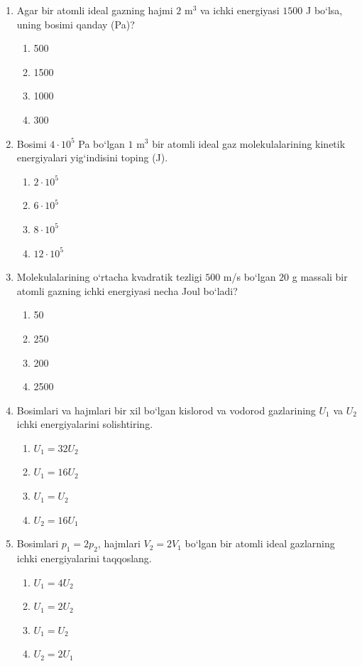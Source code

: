 \begin{enumerate}
\begin{enumerate}[label=\Alph*)]
\end{enumerate}

\item Agar bir atomli ideal gazning hajmi $2$ m$^3$ va ichki energiyasi $1500$ J bo‘lsa, uning bosimi qanday (Pa)?
\begin{enumerate}[label=\Alph*)]
\item 500
\item 1500
\item 1000
\item 300

\end{enumerate}

\item Bosimi $4\cdot10^5$ Pa bo‘lgan $1$ m$^3$ bir atomli ideal gaz molekulalarining kinetik energiyalari yig‘indisini toping (J).
\begin{enumerate}[label=\Alph*)]
\item $2\cdot10^5$
\item $6\cdot10^5$
\item $8\cdot10^5$
\item $12\cdot10^5$

\end{enumerate}

\item Molekulalarining o‘rtacha kvadratik tezligi $500$ m/s bo‘lgan $20$ g massali bir atomli gazning ichki energiyasi necha Joul bo‘ladi?
\begin{enumerate}[label=\Alph*)]
\item 50
\item 250
\item 200
\item 2500

\end{enumerate}

\item Bosimlari va hajmlari bir xil bo‘lgan kislorod va vodorod gazlarining $U_1$ va $U_2$ ichki energiyalarini solishtiring.
\begin{enumerate}[label=\Alph*)]
\item $U_1=32U_2$
\item $U_1=16U_2$
\item $U_1=U_2$
\item $U_2=16U_1$

\end{enumerate}

\item Bosimlari $p_1=2p_2$, hajmlari $V_2=2V_1$ bo‘lgan bir atomli ideal gazlarning ichki energiyalarini taqqoslang.
\begin{enumerate}[label=\Alph*)]
\item $U_1=4U_2$
\item $U_1=2U_2$
\item $U_1=U_2$
\item $U_2=2U_1$


\end{enumerate}
\end{enumerate}
